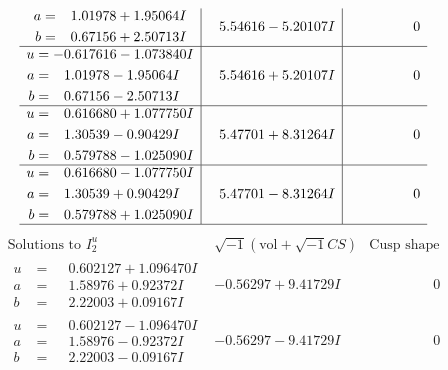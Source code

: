 \documentclass[1p]{elsarticle_modified}
\theoremstyle{definition}
\newcommand{\I}{\sqrt{-1}}
\begin{document}
$$\begin{array}{c|c|c}
\begin{aligned}
a &= \phantom{-}1.01978 + 1.95064 I \\
b &= \phantom{-}0.67156 + 2.50713 I\end{aligned}
 & \phantom{-}5.54616 - 5.20107 I & \phantom{-0.000000 } 0 \\ \hline\begin{aligned}
u &= -0.617616 - 1.073840 I \\
a &= \phantom{-}1.01978 - 1.95064 I \\
b &= \phantom{-}0.67156 - 2.50713 I\end{aligned}
 & \phantom{-}5.54616 + 5.20107 I & \phantom{-0.000000 } 0 \\ \hline\begin{aligned}
u &= \phantom{-}0.616680 + 1.077750 I \\
a &= \phantom{-}1.30539 - 0.90429 I \\
b &= \phantom{-}0.579788 - 1.025090 I\end{aligned}
 & \phantom{-}5.47701 + 8.31264 I & \phantom{-0.000000 } 0 \\ \hline\begin{aligned}
u &= \phantom{-}0.616680 - 1.077750 I \\
a &= \phantom{-}1.30539 + 0.90429 I \\
b &= \phantom{-}0.579788 + 1.025090 I\end{aligned}
 & \phantom{-}5.47701 - 8.31264 I & \phantom{-0.000000 } 0\\
 \hline 
 \end{array}$$\newpage$$\begin{array}{c|c|c}  
\text{Solutions to }I^u_{2}& \I (\text{vol} + \sqrt{-1}CS) & \text{Cusp shape}\\
 \hline 
\begin{aligned}
u &= \phantom{-}0.602127 + 1.096470 I \\
a &= \phantom{-}1.58976 + 0.92372 I \\
b &= \phantom{-}2.22003 + 0.09167 I\end{aligned}
 & -0.56297 + 9.41729 I & \phantom{-0.000000 } 0 \\ \hline\begin{aligned}
u &= \phantom{-}0.602127 - 1.096470 I \\
a &= \phantom{-}1.58976 - 0.92372 I \\
b &= \phantom{-}2.22003 - 0.09167 I\end{aligned}
 & -0.56297 - 9.41729 I & \phantom{-0.000000 } 0 \\ \hline\begin{aligned}

\end{aligned}
\end{array}$$
\end{document}
